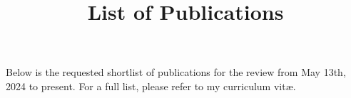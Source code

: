 \documentclass[10pt,a4paper,sans]{moderncv} %
\title{List of Publications}
\begin{document}
\makecvtitle
\vspace*{-1em}

Below is the requested shortlist of publications for the review from May 13th, 2024 to present. For a full list, please refer to my curriculum vit\ae{}.

\nocite{Gonski:2026jgu, CraigGroup:2026qmr, ATLAS:2026mla, besjes_2026_18850807, eduardo_rodrigues_2026_18610971, 202533701359_columnar, pivarski_2026_19406648, ATLAS:2024mow, Alshehri:2024wku, mqat, mqt, mqdbt, ldb}

\printbibliography
\end{document}

